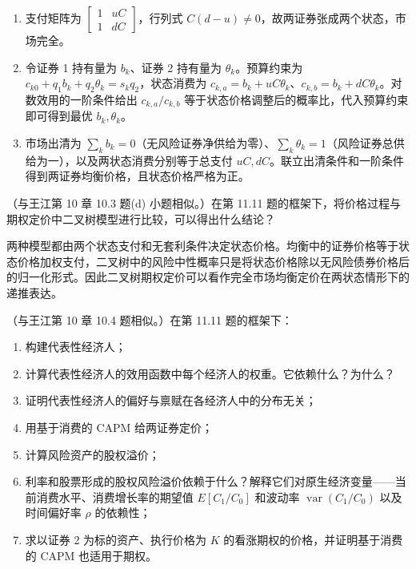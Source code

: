 \begin{solution}
\begin{enumerate}[label=(\alph*)]
\item 支付矩阵为 $\begin{bmatrix}1&uC\\1&dC\end{bmatrix}$，行列式 $C(d-u)\ne0$，故两证券张成两个状态，市场完全。
\item 令证券 1 持有量为 $b_k$、证券 2 持有量为 $\theta_k$。预算约束为 $c_{k0}+q_1b_k+q_2\theta_k=s_kq_2$，状态消费为 $c_{k,a}=b_k+uC\theta_k$、$c_{k,b}=b_k+dC\theta_k$。对数效用的一阶条件给出 $c_{k,a}/c_{k,b}$ 等于状态价格调整后的概率比，代入预算约束即可得到最优 $b_k,\theta_k$。
\item 市场出清为 $\sum_kb_k=0$（无风险证券净供给为零）、$\sum_k\theta_k=1$（风险证券总供给为一），以及两状态消费分别等于总支付 $uC,dC$。联立出清条件和一阶条件得到两证券均衡价格，且状态价格严格为正。
\end{enumerate}
\end{solution}
\begin{problem}
（与王江第 10 章 10.3 题(d) 小题相似。）在第 11.11 题的框架下，将价格过程与期权定价中二叉树模型进行比较，可以得出什么结论？
\end{problem}
\begin{solution}
两种模型都由两个状态支付和无套利条件决定状态价格。均衡中的证券价格等于状态价格加权支付，二叉树中的风险中性概率只是将状态价格除以无风险债券价格后的归一化形式。因此二叉树期权定价可以看作完全市场均衡定价在两状态情形下的递推表达。
\end{solution}
\begin{problem}
（与王江第 10 章 10.4 题相似。）在第 11.11 题的框架下：
\begin{enumerate}[label=(\alph*)]
    \item 构建代表性经济人；
    \item 计算代表性经济人的效用函数中每个经济人的权重。它依赖什么？为什么？
    \item 证明代表性经济人的偏好与禀赋在各经济人中的分布无关；
    \item 用基于消费的 CAPM 给两证券定价；
    \item 计算风险资产的股权溢价；
    \item 利率和股票形成的股权风险溢价依赖于什么？解释它们对原生经济变量——当前消费水平、消费增长率的期望值 $E[C_1/C_0]$ 和波动率 $\operatorname{var}(C_1/C_0)$ 以及时间偏好率 $\rho$ 的依赖性；
    \item 求以证券 2 为标的资产、执行价格为 $K$ 的看涨期权的价格，并证明基于消费的 CAPM 也适用于期权。
\end{enumerate}
\end{problem}
